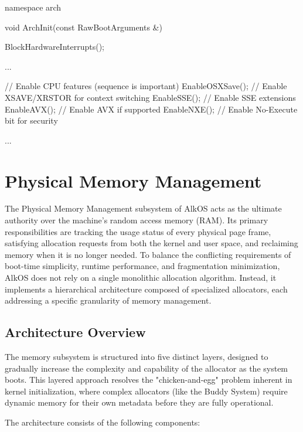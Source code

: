 \documentclass[a4paper,10pt,twoside]{report}
\theoremstyle{definition}
\begin{document}
\begin{cppcode}[caption={Architecture Initialization (init.cpp)}, label={lst:arch_init}]
namespace arch {
void ArchInit(const RawBootArguments &) {
    BlockHardwareInterrupts();
    
    ...
    
    // Enable CPU features (sequence is important)
    EnableOSXSave();    // Enable XSAVE/XRSTOR for context switching
    EnableSSE();        // Enable SSE extensions
    EnableAVX();        // Enable AVX if supported
    EnableNXE();        // Enable No-Execute bit for security
    
    ...
}
}
\end{cppcode}


\section{Physical Memory Management}
\label{sec:impl_pmm}

The Physical Memory Management subsystem of AlkOS acts as the ultimate authority over the machine's random access memory (RAM). Its primary responsibilities are tracking the usage status of every physical page frame, satisfying allocation requests from both the kernel and user space, and reclaiming memory when it is no longer needed. To balance the conflicting requirements of boot-time simplicity, runtime performance, and fragmentation minimization, AlkOS does not rely on a single monolithic allocation algorithm. Instead, it implements a hierarchical architecture composed of specialized allocators, each addressing a specific granularity of memory management.

\subsection{Architecture Overview}

The memory subsystem is structured into five distinct layers, designed to gradually increase the complexity and capability of the allocator as the system boots. This layered approach resolves the "chicken-and-egg" problem inherent in kernel initialization, where complex allocators (like the Buddy System) require dynamic memory for their own metadata before they are fully operational.

The architecture consists of the following components:
\end{document}
